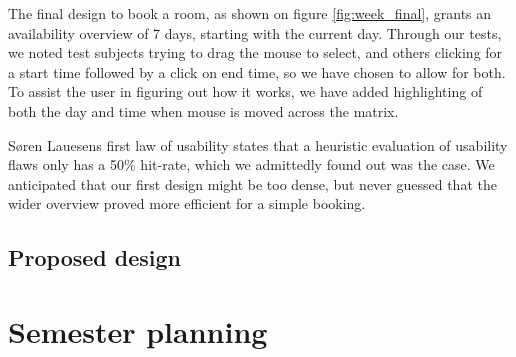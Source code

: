 The final design to book a room, as shown on figure \ref{fig:week_final}, grants an availability overview of 7 days, starting with the current day. Through our tests, we noted test subjects trying to drag the mouse to select, and others clicking for a start time followed by a click on end time, so we have chosen to allow for both.
To assist the user in figuring out how it works, we have added highlighting of both the day and time when mouse is moved across the matrix.

Søren Lauesens first law of usability\cite{lauesen} states that a heuristic evaluation of usability flaws only has a 50\% hit-rate, which we admittedly found out was the case. We anticipated that our first design might be too dense, but never guessed that the wider overview proved more efficient for a simple booking.


\subsection{Proposed design}
\label{sec:proposed_design}

\section{Semester planning}
\label{sec:semester_planning_ui}
